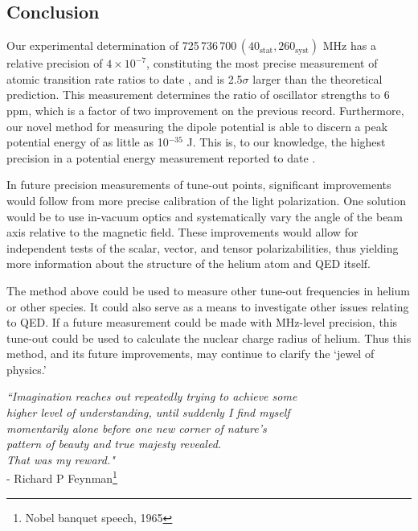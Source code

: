 \subsection{Conclusion}
	\label{sec:TO_conc}
	Our experimental determination of 725\,736\,700\,$(40_{\mathrm{stat}},260_{\mathrm{syst}})$ MHz has a relative precision of $4\times 10^{-7}$, constituting the most precise measurement of atomic transition rate ratios to date \cite{Mitroy13}, and is 2.5$\sigma$ larger than the theoretical prediction. 
	This measurement determines the ratio of oscillator strengths to 6 ppm, which is a factor of two improvement on the previous record. 
	Furthermore, our novel method for measuring the dipole potential is able to discern a peak potential energy of as little as 10$^{-35}$ J. This is, to our knowledge, the highest precision in a potential energy measurement reported to date \cite{Henson22}.
	 
	In future precision measurements of tune-out points, significant improvements would follow from more precise calibration of the light polarization.
	One solution would be to use in-vacuum optics and systematically vary the angle of the beam axis relative to the magnetic field.
	These improvements would allow for independent tests of the scalar, vector, and tensor polarizabilities, thus yielding more information about the structure of the helium atom and QED itself.

	The method above could be used to measure other tune-out frequencies in helium or other species.
	It could also serve as a means to investigate other issues relating to QED. 
	If a future measurement could be made with MHz-level precision,  this tune-out could be used to calculate the nuclear charge radius of helium. 
	Thus this method, and its future improvements, may continue to  clarify the `jewel of physics.'

\vfill


\begin{flushright}
\singlespacing
{\emph{
``Imagination reaches out repeatedly trying to achieve some \\
higher level of understanding, until suddenly I find myself \\
momentarily alone before one new corner of nature’s \\
pattern of beauty and true majesty revealed. \\
That was my reward."}\\ 
- Richard P Feynman\footnote{Nobel banquet speech, 1965}}
\end{flushright}
\onehalfspacing




